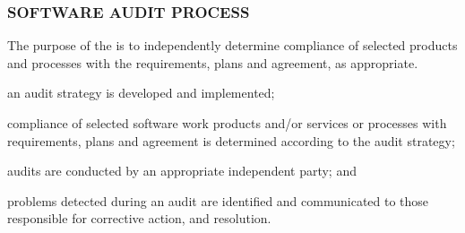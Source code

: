 		\newpage
		\subsubsection{SOFTWARE AUDIT PROCESS\label{proc:software_audit_process}}

			\begin{adjustwidth}{2em}{0pt} 

				The purpose of the  is to independently determine compliance of selected products and processes with the requirements, plans and agreement, as appropriate.

			\end{adjustwidth}

			\begin{adjustwidth}{2em}{0pt} 

				\begin{compactitem}

					\item an audit strategy is developed and implemented;

					\item compliance of selected software work products and/or services or processes with requirements, plans and agreement is determined according to the audit strategy;

					\item audits are conducted by an appropriate independent party; and

					\item problems detected during an audit are identified and communicated to those responsible for corrective action, and resolution.

				\end{compactitem}

			\end{adjustwidth}

